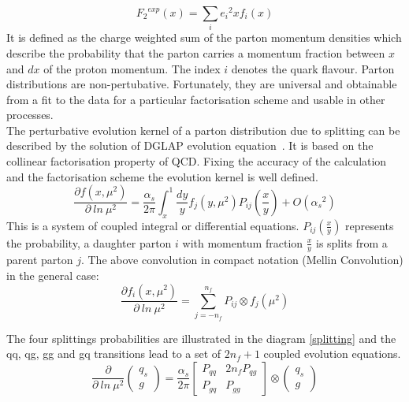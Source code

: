 \begin{equation}
{{F}_2}^{exp} (x)= \sum_i {e_i}^2 x f_i(x)
\end{equation}
\pagebreak
It is defined as the charge weighted sum of the parton momentum densities which describe the probability that the parton carries a momentum
fraction between $ x $ and $ d x $ of the proton momentum. The index $i$ denotes the quark flavour. Parton distributions are non-pertubative. Fortunately, they are universal and obtainable from a fit to the data for a particular factorisation scheme and usable in other processes.\\
The perturbative evolution kernel of a parton distribution due to splitting can be described by the solution of DGLAP evolution equation~\cite{Ward:1995xy}. It is based on the collinear factorisation property of QCD. Fixing the accuracy of the calculation and the factorisation scheme the evolution kernel is well defined.  
\begin{equation}
\frac{\partial f(x, \mu^2) }{\partial \: ln \:\mu^2}=
\frac{\alpha_s}{2\pi}\int_{x}^{1}\frac{dy}{y} f_j(y, \mu^2) P_{ij}(\frac{x}{y})+O({\alpha_s}^2)
\end{equation}
This is a system of coupled integral or differential equations. $ P_{ij}(\frac{x}{y}) $ represents the probability, a daughter parton $ i $ with momentum fraction $ \frac{x}{y} $ is splits from a parent parton $ j $.
The above convolution in compact notation (Mellin Convolution) in the general case:
\begin{equation}
\frac{\partial f_i(x, \mu^2) }{\partial \: ln \:\mu^2}=
\sum_{j=-n_f}^{n_f} P_{ij} \otimes f_j(\mu^2)
\end{equation}

The four splittings probabilities are illustrated in the diagram \ref{splitting} and the qq, qg, gg and gq transitions lead to a set of $ 2n_f +1 $ coupled evolution equations.
\begin{equation}
\frac{\partial }{\partial \: ln \:\mu^2} \left(\begin{array}{c}q_s\\ g\end{array}\right)=
\frac{\alpha_s}{2\pi}\begin{bmatrix}P_{qq} & 2n_fP_{qg} \\P_{gq} & P_{gg} \end{bmatrix}\otimes\left(\begin{array}{c}q_s\\ g\end{array}\right)
\end{equation}

